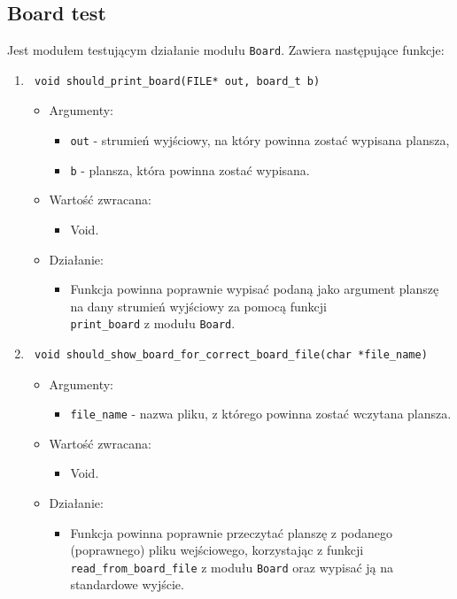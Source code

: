 \documentclass[a4paper,11pt, notitlepage ]{article}
\begin{document}
\subsection{Board test}
Jest modułem testującym działanie modułu \verb+Board+. Zawiera następujące funkcje:
\begin{enumerate}

\item \begin{verbatim} void should_print_board(FILE* out, board_t b) \end{verbatim}
\begin{itemize}
\item Argumenty:
\begin{itemize}
\item \verb+out+ - strumień wyjściowy, na który powinna zostać wypisana plansza,
\item \verb+b+ - plansza, która powinna zostać wypisana.
\end{itemize}
\item Wartość zwracana:
\begin{itemize}
\item Void.
\end{itemize}
\item Działanie:
\begin{itemize}
\item Funkcja powinna poprawnie wypisać podaną jako argument planszę na dany strumień wyjściowy za pomocą funkcji \\\verb+print_board+ z modułu \verb+Board+. 
\end{itemize}
\end{itemize}


\item \begin{verbatim} void should_show_board_for_correct_board_file(char *file_name) \end{verbatim}
\begin{itemize}
\item Argumenty:
\begin{itemize}
\item \verb+file_name+ - nazwa pliku, z którego powinna zostać wczytana plansza. 
\end{itemize}
\item Wartość zwracana:
\begin{itemize}
\item Void.
\end{itemize}
\item Działanie:
\begin{itemize}
\item Funkcja powinna poprawnie przeczytać planszę z podanego (poprawnego) pliku wejściowego, korzystając z funkcji \\\verb+read_from_board_file+ z modułu \verb+Board+ oraz wypisać ją na standardowe wyjście.
\end{itemize}
\end{itemize}



\end{enumerate}
\end{document}
